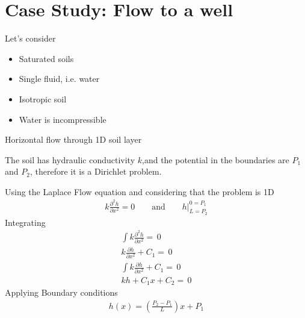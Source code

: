 \documentclass[a4paper, 11pt,article,oneside]{memoir}%
\begin{document}
\section{Case Study: Flow to a well}
Let's consider
\begin{itemize}
\item Saturated soils
\item Single fluid, i.e. water
\item Isotropic soil
\item Water is incompressible
\end{itemize}




\begin{exbox}{}{Horizontal flow through 1D soil layer}


The soil has hydraulic conductivity $k$,and the potential in the boundaries are $P_1$ and $P_2$, therefore it is a Dirichlet problem.

Using the Laplace Flow equation and considering that the problem is 1D
\begin{align*}
k\frac{\partial^2 h}{\partial x^2}=0\qquad \text{and}\qquad h|^{0=P_1}_{L=P_2}
\end{align*}
Integrating
\begin{gather*}
\int k\frac{\partial^2 h}{\partial x^2}=\,0\\
k\frac{\partial h}{\partial x^2}+C_1=\,0\\
\int k\frac{\partial h}{\partial x^2}+C_1=\,0\\ 
kh+C_1x+C_2=\,0
\end{gather*}
Applying Boundary conditions
\begin{align*}
h(x)=\left(\frac{P_2-P_1}{L}\right)x+P_1
\end{align*}
\end{exbox}
\end{document}
